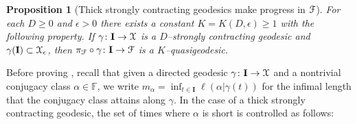\documentclass[letterpaper,fleqn]{article}
\theoremstyle{plain}
\newtheorem{proposition}[theorem]{Proposition}
\theoremstyle{definition}
\newcommand{\free}{\mathbb{F}} %
\newcommand{\factor}{{\EuScript F}} %
\newcommand{\fc}{\factor} %
\newcommand{\os}{{\EuScript X}} %
\newcommand{\fproj}{\pi_\fc} %
\newcommand{\I}{\mathbf{I}}
\begin{document}
\begin{proposition}[Thick strongly contracting geodesics make progress in $\fc$]
\label{prop:strong_contract_makes_progress}For each $D\ge 0$ and $\epsilon > 0$ there exists a constant $K = K(D,\epsilon) \ge 1$ with the following property. If $\gamma\colon \I\to \os$ is a $D$--strongly contracting geodesic and $\gamma(\I)\subset\os_\epsilon$, then $\fproj\circ\gamma\colon \I\to \fc$ is a $K$--quasigeodesic.
\end{proposition}


Before proving ,  recall that given a directed geodesic $\gamma\colon \I\to \os$ and a nontrivial conjugacy class $\alpha\in \free$, we write $m_\alpha = \inf_{t\in \I} \ell(\alpha\vert \gamma(t))$ for the infimal length that the conjugacy class attains along $\gamma$. In the case of a thick strongly contracting geodesic, the set of times where $\alpha$ is short is controlled as follows:
\end{document}
